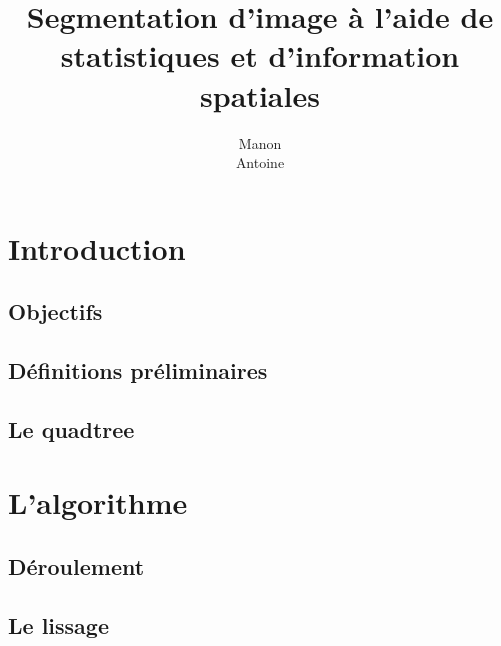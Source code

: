 \documentclass[12pt,titlepage,a4paper]{report}
\title{Segmentation d'image à l'aide de statistiques et d'information spatiales}
\author{Manon \bsc{Ansart}\\Antoine \bsc{Augusti}}
\begin{document}
	\dominitoc
	\tableofcontents

	\chapter{Introduction}
	\minitoc
		\section{Objectifs}
			

		\section{Définitions préliminaires}
			

		\section{Le quadtree}
			
	\chapter{L'algorithme}
		\section{Déroulement}
			
		\section{Le lissage}
			

	
	
\end{document}
